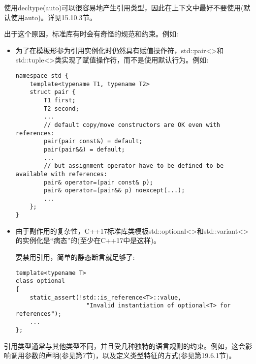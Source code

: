 使用decltype(auto)可以很容易地产生引用类型，因此在上下文中最好不要使用(默认使用auto)。详见15.10.3节。

出于这个原因，标准库有时会有奇怪的规范和约束。例如:

\begin{itemize}
\item 
为了在模板形参为引用实例化时仍然具有赋值操作符，std::pair<>和std::tuple<>类实现了赋值操作符，而不是使用默认行为。例如:

\begin{lstlisting}[style=styleCXX]
namespace std {
	template<typename T1, typename T2>
	struct pair {
		T1 first;
		T2 second;
		...
		// default copy/move constructors are OK even with references:
		pair(pair const&) = default;
		pair(pair&&) = default;
		...
		// but assignment operator have to be defined to be available with references:
		pair& operator=(pair const& p);
		pair& operator=(pair&& p) noexcept(...);
		...
	};
}
\end{lstlisting}

\item 
由于副作用的复杂性，C++17标准库类模板std::optional<>和std::variant<>的实例化是“病态”的(至少在C++17中是这样)。

要禁用引用，简单的静态断言就足够了:

\begin{lstlisting}[style=styleCXX]
template<typename T>
class optional
{
	static_assert(!std::is_reference<T>::value,
					"Invalid instantiation of optional<T> for references");
	...
};
\end{lstlisting}

\end{itemize}

引用类型通常与其他类型不同，并且受几种独特的语言规则的约束。例如，这会影响调用参数的声明(参见第7节)，以及定义类型特征的方式(参见第19.6.1节)。















